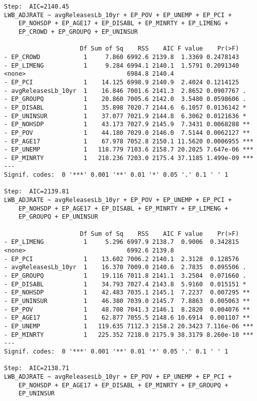 \documentclass[
  12pt,
]{article}
\begin{document}
\begin{verbatim}
Step:  AIC=2140.45
LWB_ADJRATE ~ avgReleasesLb_10yr + EP_POV + EP_UNEMP + EP_PCI + 
    EP_NOHSDP + EP_AGE17 + EP_DISABL + EP_MINRTY + EP_LIMENG + 
    EP_CROWD + EP_GROUPQ + EP_UNINSUR

                     Df Sum of Sq    RSS    AIC F value    Pr(>F)    
- EP_CROWD            1     7.860 6992.6 2139.8  1.3369 0.2478143    
- EP_LIMENG           1     9.284 6994.1 2140.1  1.5791 0.2091340    
<none>                            6984.8 2140.4                      
- EP_PCI              1    14.125 6998.9 2140.9  2.4024 0.1214125    
- avgReleasesLb_10yr  1    16.846 7001.6 2141.3  2.8652 0.0907767 .  
- EP_GROUPQ           1    20.860 7005.6 2142.0  3.5480 0.0598606 .  
- EP_DISABL           1    35.898 7020.7 2144.6  6.1057 0.0136142 *  
- EP_UNINSUR          1    37.077 7021.9 2144.8  6.3062 0.0121636 *  
- EP_NOHSDP           1    43.173 7027.9 2145.9  7.3431 0.0068288 ** 
- EP_POV              1    44.180 7029.0 2146.0  7.5144 0.0062127 ** 
- EP_AGE17            1    67.978 7052.8 2150.1 11.5620 0.0006955 ***
- EP_UNEMP            1   118.779 7103.6 2158.7 20.2025 7.647e-06 ***
- EP_MINRTY           1   218.236 7203.0 2175.4 37.1185 1.499e-09 ***
---
Signif. codes:  0 '***' 0.001 '**' 0.01 '*' 0.05 '.' 0.1 ' ' 1

Step:  AIC=2139.81
LWB_ADJRATE ~ avgReleasesLb_10yr + EP_POV + EP_UNEMP + EP_PCI + 
    EP_NOHSDP + EP_AGE17 + EP_DISABL + EP_MINRTY + EP_LIMENG + 
    EP_GROUPQ + EP_UNINSUR

                     Df Sum of Sq    RSS    AIC F value    Pr(>F)    
- EP_LIMENG           1     5.296 6997.9 2138.7  0.9006  0.342815    
<none>                            6992.6 2139.8                      
- EP_PCI              1    13.602 7006.2 2140.1  2.3128  0.128576    
- avgReleasesLb_10yr  1    16.370 7009.0 2140.6  2.7835  0.095506 .  
- EP_GROUPQ           1    19.116 7011.8 2141.1  3.2504  0.071660 .  
- EP_DISABL           1    34.793 7027.4 2143.8  5.9160  0.015151 *  
- EP_NOHSDP           1    42.483 7035.1 2145.1  7.2237  0.007295 ** 
- EP_UNINSUR          1    46.380 7039.0 2145.7  7.8863  0.005063 ** 
- EP_POV              1    48.708 7041.3 2146.1  8.2820  0.004076 ** 
- EP_AGE17            1    62.877 7055.5 2148.6 10.6914  0.001107 ** 
- EP_UNEMP            1   119.635 7112.3 2158.2 20.3423 7.116e-06 ***
- EP_MINRTY           1   225.352 7218.0 2175.9 38.3179 8.260e-10 ***
---
Signif. codes:  0 '***' 0.001 '**' 0.01 '*' 0.05 '.' 0.1 ' ' 1

Step:  AIC=2138.71
LWB_ADJRATE ~ avgReleasesLb_10yr + EP_POV + EP_UNEMP + EP_PCI + 
    EP_NOHSDP + EP_AGE17 + EP_DISABL + EP_MINRTY + EP_GROUPQ + 
    EP_UNINSUR


\end{verbatim}
\end{document}
